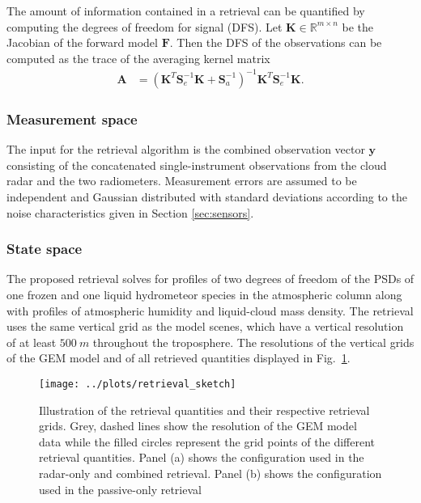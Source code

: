 \documentclass[journal abbreviation, manuscript]{copernicus}
\begin{document}
The amount of information contained in a retrieval can be quantified by
computing the degrees of freedom for signal (DFS). Let $\mathbf{K} \in
\mathbb{R}^{m \times n}$ be the Jacobian of the forward model $\mathbf{F}$. Then
the DFS of the observations can be computed as the trace of the averaging kernel
matrix
\begin{align}
  \mathbf{A} &=(\mathbf{K}^T\mathbf{S}_e^{-1}\mathbf{K} + \mathbf{S}_a^{-1})^{-1}
  \mathbf{K}^T\mathbf{S}_e^{-1}\mathbf{K}.
\end{align}

\subsubsection{Measurement space}
\label{sec:orge7dc286}

The input for the retrieval algorithm is the combined observation vector
$\mathbf{y}$ consisting of the concatenated single-instrument observations from
the cloud radar and the two radiometers. Measurement errors are assumed to be
independent and Gaussian distributed with standard deviations according to the
noise characteristics given in Section \ref{sec:sensors}.

\subsubsection{State space}
\label{sec:method:fowardmodel}

The proposed retrieval solves for profiles of two degrees of freedom of the PSDs
of one frozen and one liquid hydrometeor species in the atmospheric column
along with profiles of atmospheric humidity and liquid-cloud mass density.
The retrieval uses the same vertical grid as the model scenes, which have a
vertical resolution of at least $500\ \unit{m}$ throughout the troposphere. The
resolutions of the vertical grids of the GEM model and of all retrieved
quantities displayed in Fig.~\ref{fig:retrieval_sketch}.

\begin{figure}
\centering
\texttt{[image: ../plots/retrieval\_sketch]}
\caption{Illustration of the retrieval quantities and their respective retrieval
  grids. Grey, dashed lines show the resolution of the GEM model data while the
  filled circles represent the grid points of the different retrieval
  quantities. Panel (a) shows the configuration used in the radar-only and
  combined retrieval. Panel (b) shows the configuration used in the passive-only
  retrieval}
\label{fig:retrieval_sketch}
\end{figure}
\end{document}
